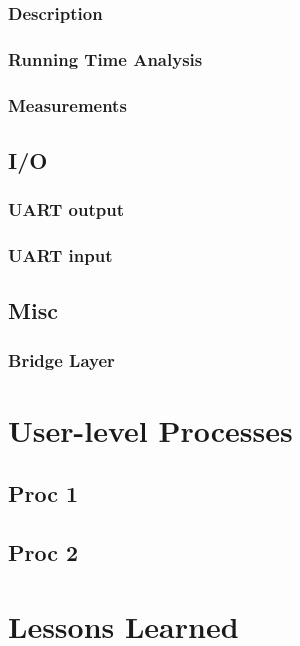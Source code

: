 \documentclass[12pt]{report}
\begin{document}
\section{Description}

\section{Running Time Analysis}

\section{Measurements}

\chapter{I/O}

\section{UART output}

\section{UART input}

\chapter{Misc}

\section{Bridge Layer}

\part{User-level Processes}

\chapter{Proc 1}

\chapter{Proc 2}

\part{Lessons Learned}
\end{document}
